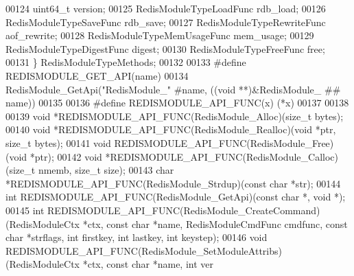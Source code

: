 \begin{DoxyCode}
00124     uint64\_t version;
00125     RedisModuleTypeLoadFunc rdb\_load;
00126     RedisModuleTypeSaveFunc rdb\_save;
00127     RedisModuleTypeRewriteFunc aof\_rewrite;
00128     RedisModuleTypeMemUsageFunc mem\_usage;
00129     RedisModuleTypeDigestFunc digest;
00130     RedisModuleTypeFreeFunc free;
00131 \} RedisModuleTypeMethods;
00132 
00133 \textcolor{preprocessor}{#}\textcolor{preprocessor}{define} \textcolor{preprocessor}{REDISMODULE\_GET\_API}\textcolor{preprocessor}{(}\textcolor{preprocessor}{name}\textcolor{preprocessor}{)}
00134     \textcolor{preprocessor}{RedisModule\_GetApi}\textcolor{preprocessor}{(}\textcolor{stringliteral}{"RedisModule\_"} \textcolor{preprocessor}{#}\textcolor{preprocessor}{name}\textcolor{preprocessor}{,} \textcolor{preprocessor}{(}\textcolor{preprocessor}{(}\textcolor{preprocessor}{void} \textcolor{preprocessor}{*}\textcolor{preprocessor}{*}\textcolor{preprocessor}{)}\textcolor{preprocessor}{&}\textcolor{preprocessor}{RedisModule\_} \textcolor{preprocessor}{##} \textcolor{preprocessor}{name}\textcolor{preprocessor}{)}\textcolor{preprocessor}{)}
00135 
00136 \textcolor{preprocessor}{#}\textcolor{preprocessor}{define} \textcolor{preprocessor}{REDISMODULE\_API\_FUNC}\textcolor{preprocessor}{(}\textcolor{preprocessor}{x}\textcolor{preprocessor}{)} \textcolor{preprocessor}{(}\textcolor{preprocessor}{*}\textcolor{preprocessor}{x}\textcolor{preprocessor}{)}
00137 
00138 
00139 \textcolor{keywordtype}{void} *REDISMODULE\_API\_FUNC(RedisModule\_Alloc)(size\_t bytes);
00140 \textcolor{keywordtype}{void} *REDISMODULE\_API\_FUNC(RedisModule\_Realloc)(\textcolor{keywordtype}{void} *ptr, size\_t bytes);
00141 \textcolor{keywordtype}{void} REDISMODULE\_API\_FUNC(RedisModule\_Free)(\textcolor{keywordtype}{void} *ptr);
00142 \textcolor{keywordtype}{void} *REDISMODULE\_API\_FUNC(RedisModule\_Calloc)(size\_t nmemb, size\_t size);
00143 \textcolor{keywordtype}{char} *REDISMODULE\_API\_FUNC(RedisModule\_Strdup)(\textcolor{keyword}{const} \textcolor{keywordtype}{char} *str);
00144 \textcolor{keywordtype}{int} REDISMODULE\_API\_FUNC(RedisModule\_GetApi)(\textcolor{keyword}{const} \textcolor{keywordtype}{char} *, \textcolor{keywordtype}{void} *);
00145 \textcolor{keywordtype}{int} REDISMODULE\_API\_FUNC(RedisModule\_CreateCommand)(RedisModuleCtx *ctx, \textcolor{keyword}{const} \textcolor{keywordtype}{char} *name, 
      RedisModuleCmdFunc cmdfunc, \textcolor{keyword}{const} \textcolor{keywordtype}{char} *strflags, \textcolor{keywordtype}{int} firstkey, \textcolor{keywordtype}{int} lastkey, \textcolor{keywordtype}{int} keystep);
00146 \textcolor{keywordtype}{void} REDISMODULE\_API\_FUNC(RedisModule\_SetModuleAttribs)(RedisModuleCtx *ctx, \textcolor{keyword}{const} \textcolor{keywordtype}{char} *name, \textcolor{keywordtype}{int} ver

\end{DoxyCode}
